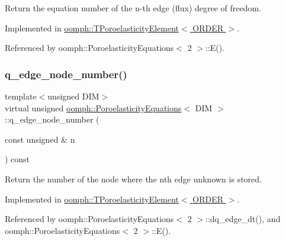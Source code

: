 Return the equation number of the n-\/th edge (flux) degree of freedom. 



Implemented in \hyperlink{classoomph_1_1TPoroelasticityElement_a662897b1eae45958e2ac4fe2cb5b63bf}{oomph\+::\+T\+Poroelasticity\+Element$<$ O\+R\+D\+E\+R $>$}.



Referenced by oomph\+::\+Poroelasticity\+Equations$<$ 2 $>$\+::\+E().

\mbox{\label{classoomph_1_1PoroelasticityEquations_a34a28eb238815fe3475c09ed256393c4}} 
\subsubsection{\texorpdfstring{q\+\_\+edge\+\_\+node\+\_\+number()}{q\_edge\_node\_number()}}
{\footnotesize\ttfamily template$<$unsigned D\+IM$>$ \\
virtual unsigned \hyperlink{classoomph_1_1PoroelasticityEquations}{oomph\+::\+Poroelasticity\+Equations}$<$ D\+IM $>$\+::q\+\_\+edge\+\_\+node\+\_\+number (\begin{DoxyParamCaption}\item[{const unsigned \&}]{n }\end{DoxyParamCaption}) const\hspace{0.3cm}{\ttfamily [pure virtual]}}



Return the number of the node where the nth edge unknown is stored. 



Implemented in \hyperlink{classoomph_1_1TPoroelasticityElement_acfccb491755f774ef5fa4803fad53abe}{oomph\+::\+T\+Poroelasticity\+Element$<$ O\+R\+D\+E\+R $>$}.



Referenced by oomph\+::\+Poroelasticity\+Equations$<$ 2 $>$\+::dq\+\_\+edge\+\_\+dt(), and oomph\+::\+Poroelasticity\+Equations$<$ 2 $>$\+::\+E().

\mbox{\label{classoomph_1_1PoroelasticityEquations_a95ed7bb3ad2efe901453f99f1e42c0a6}} 
